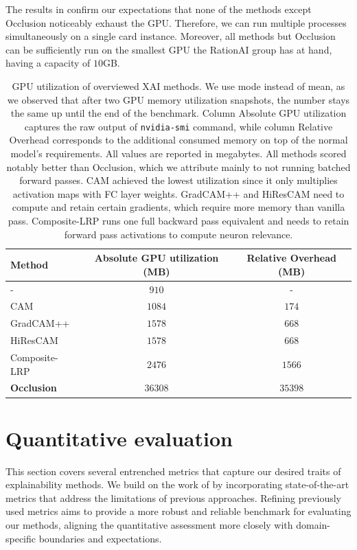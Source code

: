 The results in  confirm our expectations that none of the methods except Occlusion noticeably exhaust the GPU.
Therefore, we can run multiple processes simultaneously on a single card instance.
Moreover, all methods but Occlusion can be sufficiently run on the smallest GPU the RationAI group has at hand, having a capacity of $10$GB.
\begin{table}
\centering
{}
\begin{tabular}{@{} l c c @{}}\toprule
Method & Absolute GPU utilization (MB) & Relative Overhead (MB) \\ 
\midrule
-             & $910$        & -       \\
CAM           & $1084$       & $174$   \\
GradCAM++     & $1578$       & $668$   \\
HiResCAM      & $1578$       & $668$   \\
Composite-LRP & $2476$       & $1566$  \\
\textbf{Occlusion} & $36308$ & $35398$ \\
\bottomrule
\end{tabular}
\caption{
GPU utilization of overviewed XAI methods. We use mode instead of mean, as we observed that after two GPU memory utilization snapshots, the number stays the same up until the end of the benchmark. Column Absolute GPU utilization captures the raw output of \texttt{nvidia-smi} command, while column Relative Overhead corresponds to the additional consumed memory on top of the normal model's requirements. All values are reported in megabytes. All methods scored notably better than Occlusion, which we attribute mainly to not running batched forward passes. CAM achieved the lowest utilization since it only multiplies activation maps with FC layer weights. GradCAM++ and HiResCAM need to compute and retain certain gradients, which require more memory than vanilla pass. Composite-LRP runs one full backward pass equivalent and needs to retain forward pass activations to compute neuron relevance.
}
\label{tab:gpu-util}
\end{table}


\section{Quantitative evaluation}

This section covers several entrenched metrics that capture our desired traits of explainability methods.
We build on the work of \cite{gallo} by incorporating state-of-the-art metrics that address the limitations of previous approaches.
Refining previously used metrics aims to provide a more robust and reliable benchmark for evaluating our methods, aligning the quantitative assessment more closely with domain-specific boundaries and expectations.

